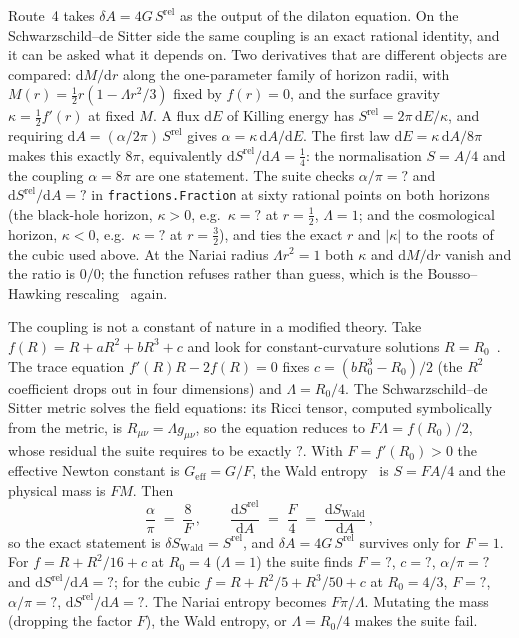\documentclass[11pt,a4paper]{article}
\newcommand{\NFFRAlphaEinstein}{?}\newcommand{\NFFRSrelEinstein}{?}
\newcommand{\NFFRKappaBH}{?}\newcommand{\NFFRKappaCosmo}{?}
\newcommand{\NFFRQuadF}{?}\newcommand{\NFFRQuadC}{?}
\newcommand{\NFFRQuadAlpha}{?}\newcommand{\NFFRQuadSrel}{?}
\newcommand{\NFFRQuadResidual}{?}\newcommand{\NFFRCubicF}{?}
\newcommand{\NFFRCubicAlpha}{?}\newcommand{\NFFRCubicSrel}{?}
\newcommand{\Srel}{S^{\mathrm{rel}}}
\newcommand{\dd}{\mathrm{d}}
\theoremstyle{plain}
\theoremstyle{definition}
\begin{document}
Route~4 takes $\delta A = 4G\,\Srel$ as the output of the dilaton equation.
On the Schwarzschild--de Sitter side the same coupling is an exact rational
identity, and it can be asked what it depends on. Two derivatives that are
different objects are compared: $\mathrm{d}M/\mathrm{d}r$ along the
one-parameter family of horizon radii, with $M(r) = \tfrac12 r
(1 - \Lambda r^2/3)$ fixed by $f(r) = 0$, and the surface gravity
$\kappa = \tfrac12 f'(r)$ at fixed $M$. A flux $\dd E$ of Killing energy has
$\Srel = 2\pi\,\dd E/\kappa$, and requiring $\dd A = (\alpha/2\pi)\,\Srel$
gives $\alpha = \kappa\,\dd A/\dd E$. The first law $\dd E = \kappa\,\dd A/8\pi$
makes this exactly $8\pi$, equivalently $\dd\Srel/\dd A = \tfrac14$: the
normalisation $S = A/4$ and the coupling $\alpha = 8\pi$ are one statement.
The suite checks $\alpha/\pi = \NFFRAlphaEinstein$ and $\dd\Srel/\dd A =
\NFFRSrelEinstein$ in \texttt{fractions.Fraction} at sixty rational points on
both horizons (the black-hole horizon, $\kappa > 0$, e.g.\ $\kappa =
\NFFRKappaBH$ at $r = \tfrac12$, $\Lambda = 1$; and the cosmological horizon,
$\kappa < 0$, e.g.\ $\kappa = \NFFRKappaCosmo$ at $r = \tfrac32$), and ties the
exact $r$ and $|\kappa|$ to the roots of the cubic used above. At the Nariai
radius $\Lambda r^2 = 1$ both $\kappa$ and $\dd M/\dd r$ vanish and the ratio
is $0/0$; the function refuses rather than guess, which is the
Bousso--Hawking rescaling~\cite{BoussoHawking} again.

The coupling is not a constant of nature in a modified theory. Take
$f(R) = R + aR^2 + bR^3 + c$ and look for constant-curvature solutions
$R = R_0$~\cite{SotiriouFaraoni}. The trace equation $f'(R)R - 2f(R) = 0$ fixes
$c = (bR_0^3 - R_0)/2$ (the $R^2$ coefficient drops out in four dimensions)
and $\Lambda = R_0/4$. The Schwarzschild--de Sitter metric solves the field
equations: its Ricci tensor, computed symbolically from the metric, is
$R_{\mu\nu} = \Lambda g_{\mu\nu}$, so the equation reduces to $F\Lambda =
f(R_0)/2$, whose residual the suite requires to be exactly $\NFFRQuadResidual$.
With $F = f'(R_0) > 0$ the effective Newton constant is $G_{\mathrm{eff}} =
G/F$, the Wald entropy~\cite{Wald1993,IyerWald1994} is $S = F A/4$ and the
physical mass is $F M$. Then
%
\begin{equation}
\frac{\alpha}{\pi} \;=\; \frac{8}{F}\,, \qquad
\frac{\dd \Srel}{\dd A} \;=\; \frac{F}{4} \;=\; \frac{\dd S_{\mathrm{Wald}}}{\dd A}\,,
\label{eq:frlaw}
\end{equation}
%
so the exact statement is $\delta S_{\mathrm{Wald}} = \Srel$, and $\delta A = 4G\,\Srel$
survives only for $F = 1$. For $f = R + R^2/16 + c$ at $R_0 = 4$
($\Lambda = 1$) the suite finds $F = \NFFRQuadF$, $c = \NFFRQuadC$,
$\alpha/\pi = \NFFRQuadAlpha$ and $\dd\Srel/\dd A = \NFFRQuadSrel$; for the cubic
$f = R + R^2/5 + R^3/50 + c$ at $R_0 = 4/3$, $F = \NFFRCubicF$, $\alpha/\pi =
\NFFRCubicAlpha$, $\dd\Srel/\dd A = \NFFRCubicSrel$. The Nariai entropy
becomes $F\pi/\Lambda$. Mutating the mass (dropping the factor $F$), the Wald
entropy, or $\Lambda = R_0/4$ makes the suite fail.
\end{document}

